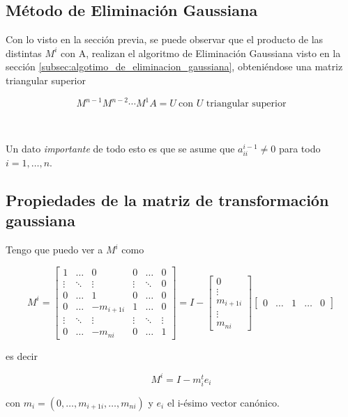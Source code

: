 \subsection{Método de Eliminación Gaussiana}\label{subsec:metodo_de_eliminacion_gaussiana}

Con lo visto en la sección previa, se puede observar que el producto de las distintas $M^i$ con A, realizan el algoritmo de Eliminación Gaussiana visto en la sección \ref{subsec:algotimo_de_eliminacion_gaussiana}, obteniéndose una matriz triangular superior

\[
M^{n-1}M^{n-2}\cdots M^{1}A = U ~\text{con $U$ triangular superior}
\]

\

Un dato \emph{importante} de todo esto es que se asume que $a_{ii}^{i-1} \neq 0$ para todo $i = 1,\ldots,n$.

\subsection{Propiedades de la matriz de transformación gaussiana}\label{subsec:propiedades_matriz_transformacion_gaussiana}

Tengo que puedo ver a $M^i$ como

\[
M^i =
\begin{bmatrix}
1 & \ldots & 0  & 0 & \ldots & 0 \\
\vdots & \ddots & \vdots & \vdots & \ddots & 0 \\
0  & \ldots & 1 & 0 & \ldots & 0 \\
0 & \ldots & -m_{i+1i} & 1 & \ldots & 0 \\
\vdots  & \ddots & \vdots & \vdots & \ddots & \vdots \\
0 & \ldots & -m_{ni} & 0 & \ldots & 1 
\end{bmatrix}
=
I -
\begin{bmatrix}
0 \\
\vdots \\
m_{i+1i} \\
\vdots \\
m_{ni}
\end{bmatrix}
\begin{bmatrix}
0 & \ldots & 1 & \ldots & 0
\end{bmatrix}
\]

es decir 

\[M^i = I - m_{i}^{t}e_i\]

con $m_i = (0, \ldots, m_{i+1i},\ldots,m_{ni})$ y $e_i$ el i-ésimo vector canónico.

